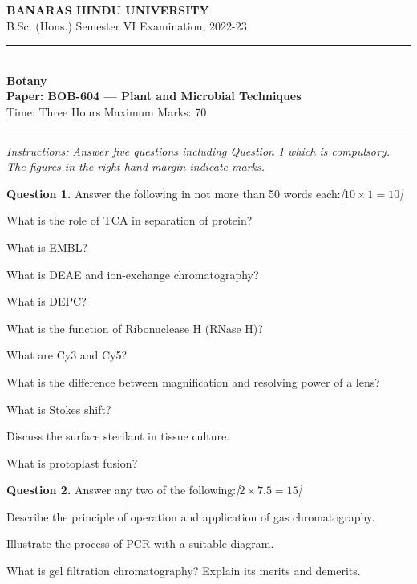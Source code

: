 \documentclass[11pt,a4paper]{article}
\newcommand{\pts}[1]{\hfill   \textit{[#1]}}
\begin{document}
\begin{center}
  {\large\bfseries BANARAS HINDU UNIVERSITY}\\[2pt]
  {\normalsize B.Sc. (Hons.) Semester VI Examination, 2022-23}\\[6pt]
  \rule{0.8\linewidth}{0.5pt}\\[6pt]
  {\large\bfseries Botany}\\[4pt]
  {\large\bfseries Paper: BOB-604 --- Plant and Microbial Techniques}\\[4pt]
  {\normalsize Time: Three Hours \hfill Maximum Marks: 70}
\end{center}

\rule{\linewidth}{0.4pt}

\smallskip



\noindent   \textit{Instructions: Answer five questions including Question 1 which is compulsory. The figures in the right-hand margin indicate marks.}

\bigskip

\medskip


\noindent   \textbf{Question 1.} Answer the following in not more than 50 words each:\pts{$10  \times 1 = 10$}

\begin{parts}
  \item What is the role of TCA in separation of protein?
  \item What is EMBL?
  \item What is DEAE and ion-exchange chromatography?
  \item What is DEPC?
  \item What is the function of Ribonuclease H (RNase H)?
  \item What are Cy3 and Cy5?
  \item What is the difference between magnification and resolving power of a lens?
  \item What is Stokes shift?
  \item Discuss the surface sterilant in tissue culture.
  \item What is protoplast fusion?
\end{parts}

\medskip


\noindent   \textbf{Question 2.} Answer any two of the following:\pts{$2  \times 7.5 = 15$}

\begin{parts}
  \item Describe the principle of operation and application of gas chromatography.
  \item Illustrate the process of PCR with a suitable diagram.
  \item What is gel filtration chromatography? Explain its merits and demerits.
\end{parts}
\end{document}
